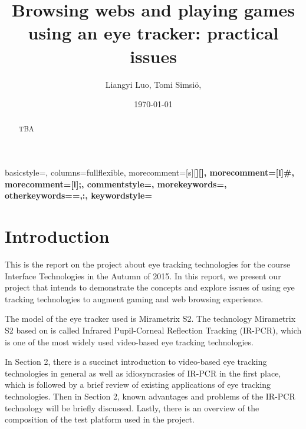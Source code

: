 \documentclass[english]{tktltiki}
\begin{document}
\onehalfspacing

{
    basicstyle=\ttfamily\small\singlespacing,
    columns=fullflexible,
    morecomment=[s][\color{Orchid}\bfseries]{[}{]},
    morecomment=[l]{\#},
    morecomment=[l]{;},
    commentstyle=\color{gray}\ttfamily,
    morekeywords={},
    otherkeywords={=,:},
    keywordstyle={\color{red}\bfseries}
}

\title{Browsing webs and playing games using an eye tracker: practical issues}
\author{Liangyi Luo, Tomi Simsiö, }
\date{\today}

\maketitle


\keywords{ }

\begin{abstract}

TBA

\end{abstract}

\mytableofcontents




\section{Introduction}

This is the report on the project about eye tracking technologies for the course Interface Technologies in the Autumn of 2015. In this report, we present our project that intends to demonstrate the concepts and explore issues of using eye tracking technologies to augment gaming and web browsing experience.  

The model of the eye tracker used is Mirametrix S2. The technology Mirametrix S2 based on is called Infrared Pupil-Corneal Reflection Tracking (IR-PCR), which is one of the most widely used video-based eye tracking technologies. 

In Section 2, there is a succinct introduction to video-based eye tracking technologies in general as well as idiosyncrasies of IR-PCR in the first place, which is followed by a brief review of existing applications of eye tracking technologies. Then in Section 2, known advantages and problems of the IR-PCR technology will be briefly discussed. Lastly, there is an overview of the composition of the test platform used in the project.
\end{document}
